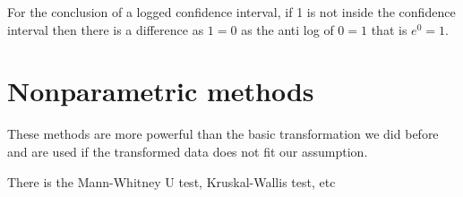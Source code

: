 \documentclass[../STAT-252-Notes.tex]{subfiles}
\begin{document}
\begin{Note}
  For the conclusion of a logged confidence interval, if 1 is not inside the confidence interval then there is a difference as $1=0$ as the anti log of $0 = 1$ that is $e^{0} = 1$.
\end{Note}

\section{Nonparametric methods}
These methods are more powerful than the basic transformation we did before and are used if the transformed data does not fit our assumption.

There is the Mann-Whitney U test, Kruskal-Wallis test, etc
\end{document}
